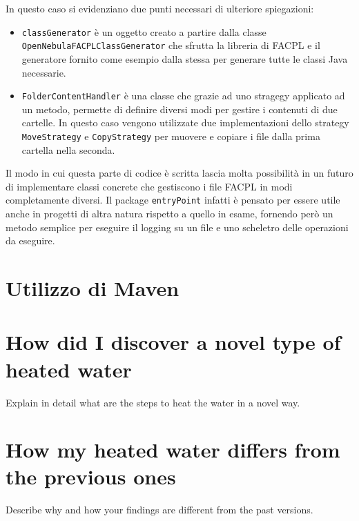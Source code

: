 In questo caso si evidenziano due punti necessari di ulteriore spiegazioni:
\begin{itemize}
    \item \texttt{classGenerator} è un oggetto creato a partire dalla classe \texttt{OpenNebulaFACPLClassGenerator} che sfrutta la libreria di FACPL e il generatore fornito come esempio dalla stessa per generare tutte le classi Java necessarie.
    \item \texttt{FolderContentHandler} è una classe che grazie ad uno stragegy\cite{GOF} applicato ad un metodo, permette di definire diversi modi per gestire i contenuti di due cartelle. In questo caso vengono utilizzate due implementazioni dello strategy \texttt{MoveStrategy} e \texttt{CopyStrategy} per muovere e copiare i file dalla prima cartella nella seconda.
\end{itemize}
Il modo in cui questa parte di codice è scritta lascia molta possibilità in un futuro di implementare classi concrete che gestiscono i file FACPL in modi completamente diversi. Il package \texttt{entryPoint} infatti è pensato per essere utile anche in progetti di altra natura rispetto a quello in esame, fornendo però un metodo semplice per eseguire il logging su un file e uno scheletro delle operazioni da eseguire.

\section{Utilizzo di Maven}

\section{How did I discover a novel type of heated water}

Explain in detail what are the steps to heat the water in a novel way.

\section{How my heated water differs from the previous ones}

Describe why and how your findings are different from the past versions.

